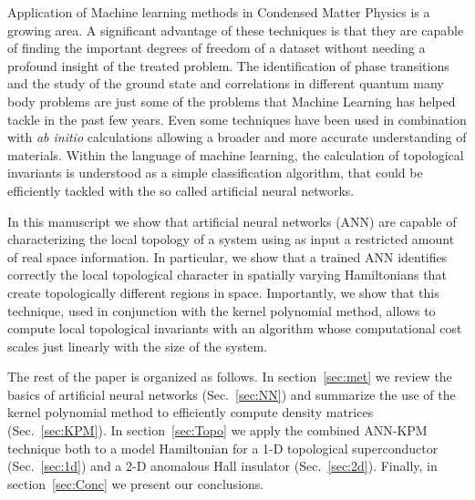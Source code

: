 Application of Machine learning methods in Condensed Matter Physics
is a growing area.
A significant advantage of these techniques is that they are capable of finding the
important degrees of freedom of a dataset without needing a profound insight of
the treated problem.
The identification of phase transitions\cite{VanNieuwenburg2017,PhysRevX.7.031038,ohtsuki2016deep,PhysRevE.95.062122,broecker2017quantum,koch2017mutual}
and the study of the ground state and correlations in different quantum many
body
problems\cite{carleo2017solving,deng2016exact,PhysRevX.7.021021,PhysRevLett.118.216401,nagai2017self,PhysRevE.97.013306}
are just some of the problems that Machine Learning has helped tackle in the
past few years. Even some techniques have been used in combination with
\textit{ab initio} calculations allowing a broader and more accurate
understanding of
materials.\cite{PhysRevLett.108.058301,bartok2017machine,gao2016machine}
Within the language of machine learning, the calculation of topological
invariants is understood as a simple classification algorithm,\cite{Zhang2018,yoshioka2017learning}
that could be
efficiently tackled with the so called artificial neural networks.
\cite{alexnet2012,Dede20107,Lecun1998,Goldberg2015,Bengio2003,pybrain}


In this manuscript we show that artificial neural networks (ANN) are capable of
characterizing the local topology of a system using as input a restricted amount
of real space information.
In particular, we show that a trained ANN identifies correctly the local
topological character in spatially varying Hamiltonians that create
topologically different regions in space.
Importantly, we show that this technique, used in conjunction with the kernel
polynomial method, allows to compute local topological invariants with
an algorithm whose computational cost scales just linearly with the size of the
system.

The rest of the paper is organized as follows. In section~\ref{sec:met} we
review the basics of artificial neural networks (Sec.~\ref{sec:NN}) and
summarize the use of the kernel polynomial method to efficiently compute density
matrices (Sec.~\ref{sec:KPM}).
In section~\ref{sec:Topo} we apply the combined ANN-KPM technique both to a
model Hamiltonian for a 1-D topological superconductor (Sec.~\ref{sec:1d}) and a
2-D anomalous Hall insulator (Sec.~\ref{sec:2d}). Finally, in
section~\ref{sec:Conc} we present our conclusions.




